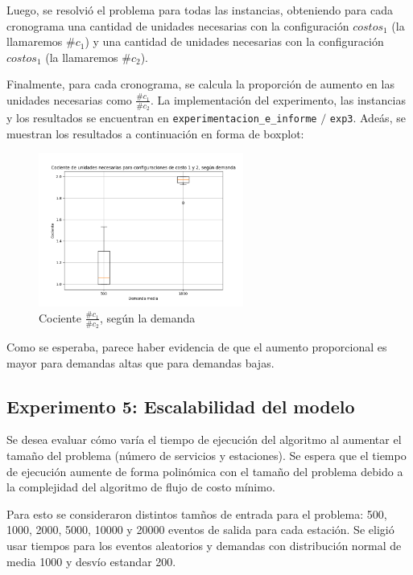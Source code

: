 \documentclass{article}
\begin{document}
Luego, se resolvió el problema para todas las instancias, obteniendo para cada cronograma una cantidad de unidades necesarias con la configuración $costos_1$ (la llamaremos $\#c_1$) y una cantidad de unidades necesarias con la configuración $costos_1$ (la llamaremos $\#c_2$).

Finalmente, para cada cronograma, se calcula la proporción de aumento en las unidades necesarias como $\frac{\#c_1}{\#c_2}$. La implementación del experimento, las instancias y los resultados se encuentran en \texttt{experimentacion\_e\_informe} $/$ \texttt{exp3}. Adeás, se muestran los resultados a continuación en forma de boxplot:

\begin{figure}[H]
    \centering
    \includegraphics[width=0.6\textwidth]{exp4/cocientes.png}
    \caption{Cociente $\frac{\#c_1}{\#c_2}$, según la demanda}
    \label{fig:ejemplo}
\end{figure}

Como se esperaba, parece haber evidencia de que el aumento proporcional es mayor para demandas altas que para demandas bajas. 

\subsection*{Experimento 5: Escalabilidad del modelo}

Se desea evaluar cómo varía el tiempo de ejecución del algoritmo al aumentar el tamaño del problema (número de servicios y estaciones). Se espera que el tiempo de ejecución aumente de forma polinómica con el tamaño del problema debido a la complejidad del algoritmo de flujo de costo mínimo.

Para esto se consideraron distintos tamños de entrada para el problema: 500, 1000, 2000, 5000, 10000 y 20000 eventos de salida para cada estación. Se eligió usar tiempos para los eventos aleatorios y demandas con distribución normal de media 1000 y desvío estandar 200.
\end{document}
